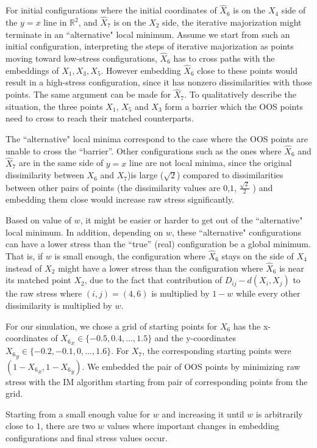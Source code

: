 \documentclass[12pt,oneside,final]{thesis}
\begin{document}
For  initial configurations where the initial coordinates of $\hat{X}_6$ is on the $X_4$ side of the $y=x$ line  in  $\mathbb{R}^2$, and $\hat{X}_7$ is on the $X_2$ side, the iterative majorization might terminate  in an ``alternative" local minimum.
Assume we start from such an initial configuration, interpreting the steps of iterative majorization as points moving toward low-stress configurations, $\hat{X}_6$  has to cross paths with the embeddings of  ${X}_1,{X}_3,{X}_5$. However embedding $\hat{X}_6$ close to these points would result in a high-stress configuration, since it has   nonzero dissimilarities with those points. The same argument can be made for $\hat{X}_7$. To qualitatively describe the situation, the three points $X_1$, $X_5$ and $X_3$ form a barrier which the OOS points need to cross  to reach their matched counterparts. 

The ``alternative" local minima correspond to the case where the OOS points are unable to cross the ``barrier''. Other configurations such as the ones where $\hat{X}_6$ and $\hat{X}_7$  are  in the same side of $y=x$ line are not local minima, since the original dissimilarity between $X_6$ and $X_7$)is large ($\sqrt{2}$) compared to dissimilarities between other pairs of points (the dissimilarity  values are $0$,$1$, $\frac{\sqrt{2}}{2}$ ) and embedding them close would increase raw stress significantly.

Based on value of $w$, it might be easier or harder to get out of the  ``alternative" local minimum.
In addition, depending on $w$, these  ``alternative"   configurations can have a lower stress than  the ``true'' (real) configuration  be a global minimum. 
That is, if $w$ is small enough, the configuration where $\hat{X}_6$ stays on the side of $X_4$ instead of $X_2$ might have a lower stress than the configuration where $\hat{X}_6$ is near its matched point $X_2$, due to the fact that  contribution of $ D_{ij}-d(X_i,X_j)$ to the raw stress where $(i,j)=(4,6)$  is  multiplied by $1-w$ while every other dissimilarity is multiplied by $w$. 

For our simulation, we chose a grid of starting points for $X_6$ has the x-coordinates of  ${X_6}_x \in \{-0.5,0.4,\ldots,1.5\}$  and the y-coordinates ${X_6}_y \in  \{-0.2,-0.1,0,\ldots,1.6\}$. For  $X_7$, the corresponding starting points were $(1-{X_6}_x,1-{X_6}_y)$. We embedded the pair of OOS points  by minimizing raw stress with the IM algorithm starting from pair of corresponding points from the grid.

Starting from a small enough value for $w$ and increasing it until $w$ is arbitrarily close to $1$, there are two $w$ values where important changes in embedding configurations and final stress values occur.
\end{document}

